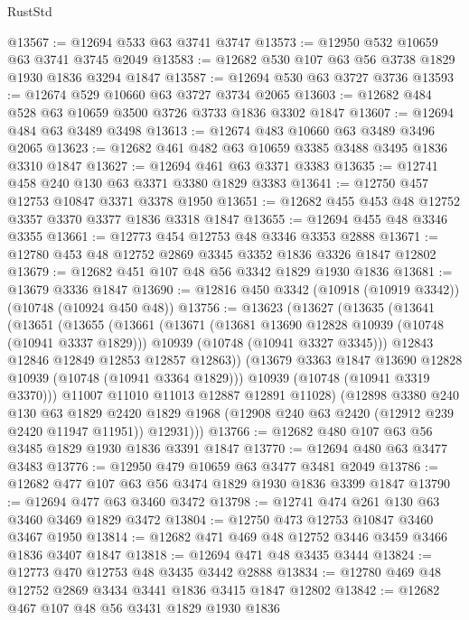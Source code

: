 \begin{lexlean}{RustStd}
\begin{coremodule}
@13567 := @12694 @533 @63 @3741 @3747
@13573 := @12950 @532 @10659 @63 @3741 @3745 @2049
@13583 := @12682 @530 @107 @63 @56 @3738 @1829 @1930 @1836 @3294 @1847
@13587 := @12694 @530 @63 @3727 @3736
@13593 := @12674 @529 @10660 @63 @3727 @3734 @2065
@13603 := @12682 @484 @528 @63 @10659 @3500 @3726 @3733 @1836 @3302 @1847
@13607 := @12694 @484 @63 @3489 @3498
@13613 := @12674 @483 @10660 @63 @3489 @3496 @2065
@13623 := @12682 @461 @482 @63 @10659 @3385 @3488 @3495 @1836 @3310 @1847
@13627 := @12694 @461 @63 @3371 @3383
@13635 := @12741 @458 @240 @130 @63 @3371 @3380 @1829 @3383
@13641 := @12750 @457 @12753 @10847 @3371 @3378 @1950
@13651 := @12682 @455 @453 @48 @12752 @3357 @3370 @3377 @1836 @3318 @1847
@13655 := @12694 @455 @48 @3346 @3355
@13661 := @12773 @454 @12753 @48 @3346 @3353 @2888
@13671 := @12780 @453 @48 @12752 @2869 @3345 @3352 @1836 @3326 @1847 @12802
@13679 := @12682 @451 @107 @48 @56 @3342 @1829 @1930 @1836
@13681 := @13679 @3336 @1847
@13690 := @12816 @450 @3342 (@10918 (@10919 @3342)) (@10748 (@10924 @450 @48))
@13756 := @13623
    (@13627
      (@13635
        (@13641
          (@13651
            (@13655
              (@13661
                (@13671
                  (@13681 @13690 @12828 @10939 (@10748 (@10941 @3337 @1829)))
                  @10939
                  (@10748 (@10941 @3327 @3345)))
                @12843
                @12846
                @12849
                @12853
                @12857
                @12863))
            (@13679 @3363 @1847 @13690 @12828 @10939 (@10748 (@10941 @3364 @1829)))
            @10939
            (@10748 (@10941 @3319 @3370)))
          @11007
          @11010
          @11013
          @12887
          @12891
          @11028)
        (@12898
          @3380
          @240
          @130
          @63
          @1829
          @2420
          @1829
          @1968
          (@12908 @240 @63 @2420 (@12912 @239 @2420 @11947 @11951))
          @12931)))
@13766 := @12682 @480 @107 @63 @56 @3485 @1829 @1930 @1836 @3391 @1847
@13770 := @12694 @480 @63 @3477 @3483
@13776 := @12950 @479 @10659 @63 @3477 @3481 @2049
@13786 := @12682 @477 @107 @63 @56 @3474 @1829 @1930 @1836 @3399 @1847
@13790 := @12694 @477 @63 @3460 @3472
@13798 := @12741 @474 @261 @130 @63 @3460 @3469 @1829 @3472
@13804 := @12750 @473 @12753 @10847 @3460 @3467 @1950
@13814 := @12682 @471 @469 @48 @12752 @3446 @3459 @3466 @1836 @3407 @1847
@13818 := @12694 @471 @48 @3435 @3444
@13824 := @12773 @470 @12753 @48 @3435 @3442 @2888
@13834 := @12780 @469 @48 @12752 @2869 @3434 @3441 @1836 @3415 @1847 @12802
@13842 := @12682 @467 @107 @48 @56 @3431 @1829 @1930 @1836

\end{coremodule}
\end{lexlean}
